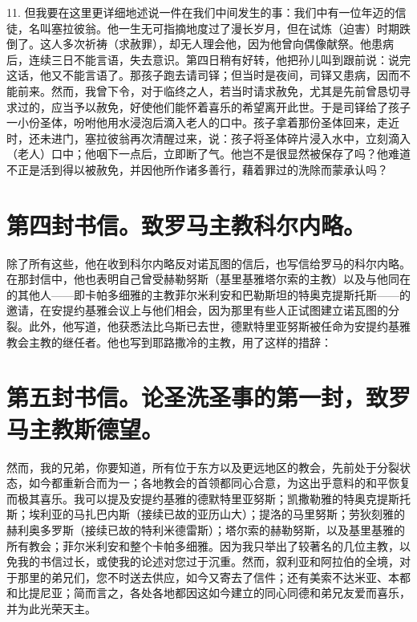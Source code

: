 11. 但我要在这里更详细地述说一件在我们中间发生的事：我们中有一位年迈的信徒，名叫塞拉彼翁。他一生无可指摘地度过了漫长岁月，但在试炼（迫害）时期跌倒了。这人多次祈祷（求赦罪），却无人理会他，因为他曾向偶像献祭。他患病后，连续三日不能言语，失去意识。第四日稍有好转，他把孙儿叫到跟前说：说完这话，他又不能言语了。那孩子跑去请司铎；但当时是夜间，司铎又患病，因而不能前来。然而，我曾下令，对于临终之人，若当时请求赦免，尤其是先前曾恳切寻求过的，应当予以赦免，好使他们能怀着喜乐的希望离开此世。于是司铎给了孩子一小份圣体，吩咐他用水浸泡后滴入老人的口中。孩子拿着那份圣体回来，走近时，还未进门，塞拉彼翁再次清醒过来，说：孩子将圣体碎片浸入水中，立刻滴入（老人）口中；他咽下一点后，立即断了气。他岂不是很显然被保存了吗？他难道不正是活到得以被赦免，并因他所作诸多善行，藉着罪过的洗除而蒙承认吗？\par


\section{第四封书信。致罗马主教科尔内略。}

除了所有这些，他在收到科尔内略反对诺瓦图的信后，也写信给罗马的科尔内略。在那封信中，他也表明自己曾受赫勒努斯（基里基雅塔尔索的主教）以及与他同在的其他人——即卡帕多细雅的主教菲尔米利安和巴勒斯坦的特奥克提斯托斯——的邀请，在安提约基雅会议上与他们相会，因为那里有些人正试图建立诺瓦图的分裂。此外，他写道，他获悉法比乌斯已去世，德默特里亚努斯被任命为安提约基雅教会主教的继任者。他也写到耶路撒冷的主教，用了这样的措辞：\par


\section{第五封书信。论圣洗圣事的第一封，致罗马主教斯德望。}

然而，我的兄弟，你要知道，所有位于东方以及更远地区的教会，先前处于分裂状态，如今都重新合而为一；各地教会的首领都同心合意，为这出乎意料的和平恢复而极其喜乐。我可以提及安提约基雅的德默特里亚努斯；凯撒勒雅的特奥克提斯托斯；埃利亚的马扎巴内斯（接续已故的亚历山大）；提洛的马里努斯；劳狄刻雅的赫利奥多罗斯（接续已故的特利米德雷斯）；塔尔索的赫勒努斯，以及基里基雅的所有教会；菲尔米利安和整个卡帕多细雅。因为我只举出了较著名的几位主教，以免我的书信过长，或使我的论述对您过于沉重。然而，叙利亚和阿拉伯的全境，对于那里的弟兄们，您不时送去供应，如今又寄去了信件；还有美索不达米亚、本都和比提尼亚；简而言之，各处各地都因这如今建立的同心同德和弟兄友爱而喜乐，并为此光荣天主。\par

